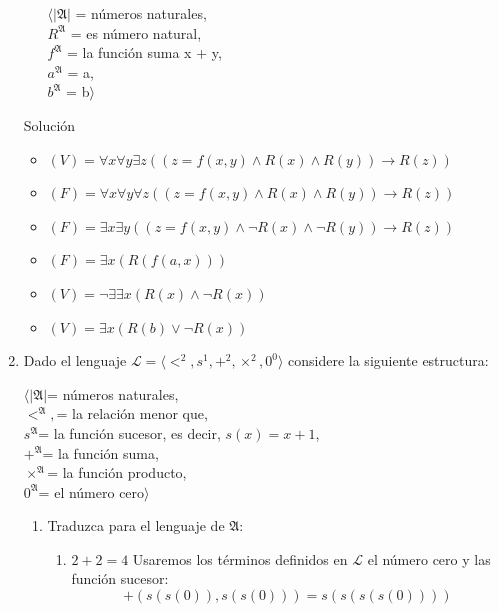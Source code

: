 \documentclass{article}
\begin{document}
\begin{enumerate}
\begin{enumerate}
		    \begin{displayquote}
    		    $\langle | \mathfrak{A} |$ = números naturales, \\
    		    $R^\mathfrak{A}$ = es número natural, \\
    		    $f^\mathfrak{A}$ = la función suma x + y, \\
    		    $a^\mathfrak{A}$ = a,\\
    		    $b^\mathfrak{A}$ = b$\rangle$
    		\end{displayquote}
		    
		\end{enumerate}
		
		Solución
		\begin{itemize}
            \item $(V) = \forall x \forall y \exists z((z=f(x,y) \land R(x) \land R(y)) \to R(z))$
            \item $(F) = \forall x \forall y \forall z((z=f(x,y) \land R(x) \land R(y)) \to R(z))$
            \item $(F) = \exists x \exists y ((z=f(x,y) \land  \neg R(x) \land \neg R(y)) \to R(z))$
            \item $(F) = \exists x (R(f(a,x)))$
            \item $(V) = 
            \neg \exists ∃x(R(x) \land  \neg R(x))$
            \item $(V) = 
            \exists x(R(b) \lor \neg R(x))$
        \end{itemize}
		
		\item Dado el lenguaje $\mathscr{L} = \langle  <^2, s^1, +^2, \times^2, 0^0 \rangle $ considere la siguiente estructura:
		
		\begin{displayquote}
		    $\langle | \mathfrak{A} |$= números naturales, \\
		    $<^\mathfrak{A},$= la relación menor que, \\
		    $s^\mathfrak{A}$= la función sucesor, es decir, $s(x) = x+1$,\\
		    $+^\mathfrak{A}$= la función suma, \\
		    $\times^\mathfrak{A}$= la función producto, \\
		    $0^\mathfrak{A}$= el número cero$\rangle$
		\end{displayquote}
		
		\begin{enumerate}
		    \item Traduzca para el lenguaje de $\mathfrak{A}$:
		    \begin{enumerate}
		        \item $2+2 = 4$
		            Usaremos los términos definidos en $\mathscr{L}$ el número cero y las función sucesor:
		            $$ +( s(s(0)),s(s(0)) ) = s(s(s(s(0))))$$
		            

\end{enumerate}
\end{enumerate}
\end{enumerate}
\end{document}
